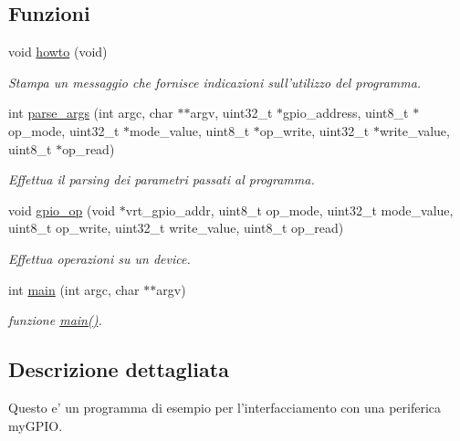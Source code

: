 \subsection*{Funzioni}
\begin{DoxyCompactItemize}
\item 
void \hyperlink{group___no_driver_ga05909651fa170a63e98e3f8e13451b7b}{howto} (void)
\begin{DoxyCompactList}\small\item\em Stampa un messaggio che fornisce indicazioni sull'utilizzo del programma. \end{DoxyCompactList}\item 
int \hyperlink{group___no_driver_ga218f8a9dfc36572bfe2230c5e2d2c776}{parse\+\_\+args} (int argc, char $\ast$$\ast$argv, uint32\+\_\+t $\ast$gpio\+\_\+address, uint8\+\_\+t $\ast$op\+\_\+mode, uint32\+\_\+t $\ast$mode\+\_\+value, uint8\+\_\+t $\ast$op\+\_\+write, uint32\+\_\+t $\ast$write\+\_\+value, uint8\+\_\+t $\ast$op\+\_\+read)
\begin{DoxyCompactList}\small\item\em Effettua il parsing dei parametri passati al programma. \end{DoxyCompactList}\item 
void \hyperlink{group___no_driver_ga879d8b839631449ecb5bc4d0721432b6}{gpio\+\_\+op} (void $\ast$vrt\+\_\+gpio\+\_\+addr, uint8\+\_\+t op\+\_\+mode, uint32\+\_\+t mode\+\_\+value, uint8\+\_\+t op\+\_\+write, uint32\+\_\+t write\+\_\+value, uint8\+\_\+t op\+\_\+read)
\begin{DoxyCompactList}\small\item\em Effettua operazioni su un device. \end{DoxyCompactList}\item 
int \hyperlink{group___no_driver_ga3c04138a5bfe5d72780bb7e82a18e627}{main} (int argc, char $\ast$$\ast$argv)
\begin{DoxyCompactList}\small\item\em funzione \hyperlink{group___no_driver_ga3c04138a5bfe5d72780bb7e82a18e627}{main()}. \end{DoxyCompactList}\end{DoxyCompactItemize}


\subsection{Descrizione dettagliata}
Questo e' un programma di esempio per l'interfacciamento con una periferica my\+G\+P\+I\+O. 

